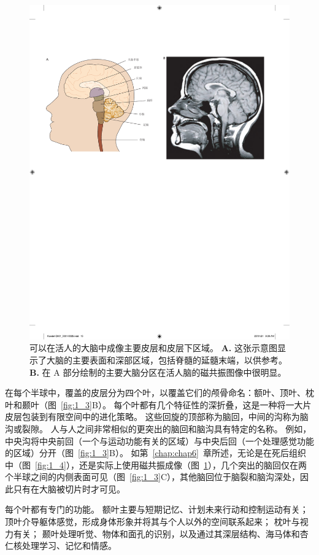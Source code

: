 \begin{figure}[htbp]
	\centering
	\includegraphics[width=0.9\linewidth]{chap01/fig_1_5}
	\caption{可以在活人的大脑中成像主要皮层和皮层下区域。
		\textbf{A.} 这张示意图显示了大脑的主要表面和深部区域，包括脊髓的延髓末端，以供参考。
		\textbf{B.} 在 A 部分绘制的主要大脑分区在活人脑的磁共振图像中很明显。}
	\label{fig:1_5}
\end{figure}


在每个半球中，覆盖的皮层分为四个叶，以覆盖它们的颅骨命名：额叶、顶叶、枕叶和颞叶（图~\ref{fig:1_3}B）。
每个叶都有几个特征性的深折叠，这是一种将一大片皮层包装到有限空间中的进化策略。
这些回旋的顶部称为脑回，中间的沟称为脑沟或裂隙。 
人与人之间非常相似的更突出的脑回和脑沟具有特定的名称。
例如，中央沟将中央前回（一个与运动功能有关的区域）与中央后回（一个处理感觉功能的区域）分开（图~\ref{fig:1_3}B）。
如第~\ref{chap:chap6}~章所述，无论是在死后组织中（图~\ref{fig:1_4}），还是实际上使用磁共振成像（图~\ref{fig:1_5}），几个突出的脑回仅在两个半球之间的内侧表面可见（图~\ref{fig:1_3}C），其他脑回位于脑裂和脑沟深处，因此只有在大脑被切片时才可见。


每个叶都有专门的功能。
额叶主要与短期记忆、计划未来行动和控制运动有关；
顶叶介导躯体感觉，形成身体形象并将其与个人以外的空间联系起来；
枕叶与视力有关；
颞叶处理听觉、物体和面孔的识别，以及通过其深层结构、海马体和杏仁核处理学习、记忆和情感。


